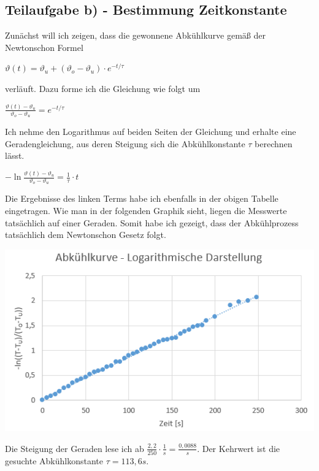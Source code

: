 \documentclass{article}
\begin{document}
\subsection*{Teilaufgabe b) - Bestimmung Zeitkonstante}
Zunächst will ich zeigen, dass die gewonnene Abkühlkurve gemäß der Newtonschon Formel 
\begin{center}
	$\vartheta (t) = \vartheta_u + (\vartheta_o - \vartheta_u) \cdot e^{-t/\tau}$ 
\end{center}
verläuft. Dazu forme ich die Gleichung wie folgt um
\begin{center}
	$\frac{\vartheta (t) - \vartheta_u}{\vartheta_o - \vartheta_u} = e^{-t/\tau}$ 
\end{center}
Ich nehme den Logarithmus auf beiden Seiten der Gleichung und erhalte eine Geradengleichung, 
aus deren Steigung sich die Abkühlkonstante $\tau$ berechnen lässt.
\begin{center}
	$-\ln{\frac{\vartheta (t) - \vartheta_u}{\vartheta_o - \vartheta_u}} = \frac{1}{\tau}\cdot t$ 
\end{center}
Die Ergebnisse des linken Terms habe ich ebenfalls in der obigen Tabelle eingetragen. 
Wie man in der folgenden Graphik sieht, liegen die Messwerte tatsächlich auf einer Geraden. Somit habe ich gezeigt, dass der Abkühlprozess tatsächlich dem Newtonschon Gesetz folgt.  
\begin{center}
	\includegraphics[scale=0.6]{Graph2.png}
\end{center}
Die Steigung der Geraden lese ich ab $\frac{2,2}{250}\cdot\frac{1}{s}=\frac{0,0088}{s}$.
Der Kehrwert ist die gesuchte Abkühlkonstante $\tau = 113,6 s$.
\end{document}
